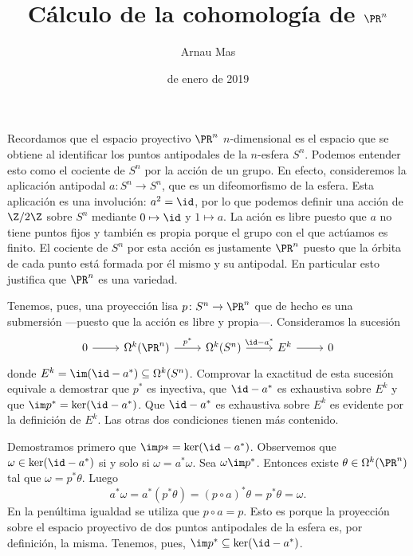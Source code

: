\documentclass[12pt]{article}
\title{\sffamily {\bfseries Seminario 3:} Cálculo de la cohomología de \( \PR^n \)}
\author{\sffamily Arnau Mas}
\date{\sffamily 10 de enero de 2019}
\begin{document}
\maketitle

Recordamos que el espacio proyectivo \( \PR^n \) \( n \)-dimensional es el espacio que se
obtiene al identificar los puntos antipodales de la \( n \)-esfera \( S^n \). Podemos
entender esto como el cociente de \( S^n \) por la acción de un grupo. En efecto,
consideremos la aplicación antipodal \( a \colon S^n \to S^n \), que es un difeomorfismo
de la esfera. Esta aplicación es una involución: \( a^2 = \id \), por lo que podemos
definir una acción de \( \Z/2\Z \) sobre \( S^n \) mediante \( 0 \mapsto \id \) y \( 1
\mapsto a \). La ación es libre puesto que \( a \) no tiene puntos fijos y también es
propia porque el grupo con el que actúamos es finito. El cociente de \( S^n \) por esta
acción es justamente \( \PR^n \) puesto que la órbita de cada punto está formada por él
mismo y su antipodal. En particular esto justifica que \( \PR^n \) es una variedad. 

\parbreak

Tenemos, pues, una proyección lisa \( p \colon S^n \to \PR^n \) que de hecho es una
submersión ---puesto que la acción es libre y propia---. Consideramos la sucesión
\begin{equation}\label{eq:sucesion exacta corta}
	\begin{tikzcd}
		0 \arrow[r] & \Omega^k(\PR^n) \arrow[r, "p^\ast"] & \Omega^k(S^n) \arrow[r, "\id -
		a^\ast"] & E^k \arrow[r] & 0
	\end{tikzcd}
\end{equation}
donde \( E^k = \im(\id - a^\ast) \subseteq \Omega^k(S^n) \). Comprovar la exactitud de
esta sucesión equivale a demostrar que \( p^\ast \) es inyectiva, que \( \id - a^\ast \)
es exhaustiva sobre \( E^k \) y que \( \im p^\ast = \ker(\id - a^\ast) \). Que \( \id -
a^\ast \) es exhaustiva sobre \( E^k \) es evidente por la definición de \( E^k \). Las
otras dos condiciones tienen más contenido.

Demostramos primero que \( \im p\ast = \ker(\id - a^\ast) \). Observemos que \( \omega \in
\ker(\id - a^\ast) \) si y solo si \( \omega = a^\ast \omega \). Sea \( \omega \im p^\ast
\). Entonces existe \( \theta \in \Omega^k(\PR^n) \) tal que \( \omega = p^\ast \theta \).
Luego
\begin{equation*}
	a^\ast \omega = a^\ast (p^\ast \theta) = (p \circ a)^\ast \theta = p^\ast \theta =
	\omega.
\end{equation*}
En la penúltima igualdad se utiliza que \( p \circ a = p \). Esto es porque la proyección
sobre el espacio proyectivo de dos puntos antipodales de la esfera es, por definición, la
misma. Tenemos, pues, \( \im p^\ast \subseteq \ker(\id - a^\ast) \).
\end{document}
